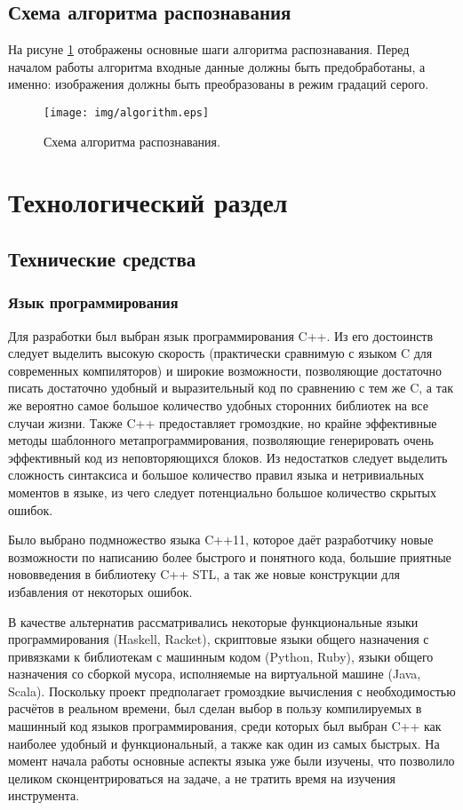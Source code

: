 \documentclass[a4paper,12pt]{report}
\numberwithin{equation}{section}
\begin{document}
\subsection{Схема алгоритма распознавания}

На рисуне \ref{fig:alg} отображены основные шаги алгоритма распознавания. Перед
началом работы алгоритма входные данные должны быть предобработаны, а именно:
изображения должны быть преобразованы в режим градаций серого.

\begin{figure}[h!]
  \centering
  \texttt{[image: img/algorithm.eps]}
  \caption{Схема алгоритма распознавания.}
  \label{fig:alg}
\end{figure}

\section{Технологический раздел}

\subsection{Технические средства}

\subsubsection{Язык программирования}
Для разработки был выбран язык программирования C++. Из его достоинств следует
выделить высокую скорость (практически сравнимую с языком C для современных
компиляторов) и широкие возможности, позволяющие достаточно писать достаточно
удобный и выразительный код по сравнению с тем же C, а так же вероятно самое
большое количество удобных сторонних библиотек на все случаи жизни. Также C++
предоставляет громоздкие, но крайне эффективные методы шаблонного
метапрограммирования, позволяющие генерировать очень эффективный код из
неповторяющихся блоков. Из недостатков следует выделить сложность синтаксиса и
большое количество правил языка и нетривиальных моментов в языке, из чего
следует потенциально большое количество скрытых ошибок.

Было выбрано подмножество языка C++11, которое даёт разработчику новые
возможности по написанию более быстрого и понятного кода, большие приятные
нововведения в библиотеку C++ STL, а так же новые конструкции для избавления от
некоторых ошибок.

В качестве альтернатив рассматривались некоторые функциональные языки
программирования (Haskell, Racket), скриптовые языки общего назначения с
привязками к библиотекам с машинным кодом (Python, Ruby), языки общего
назначения со сборкой мусора, исполняемые на виртуальной машине (Java,
Scala). Поскольку проект предполагает громоздкие вычисления с необходимостью
расчётов в реальном времени, был сделан выбор в пользу компилируемых в машинный
код языков программирования, среди которых был выбран C++ как наиболее удобный и
функциональный, а также как один из самых быстрых.  На момент начала работы
основные аспекты языка уже были изучены, что позволило целиком
сконцентрироваться на задаче, а не тратить время на изучения инструмента.
\end{document}

